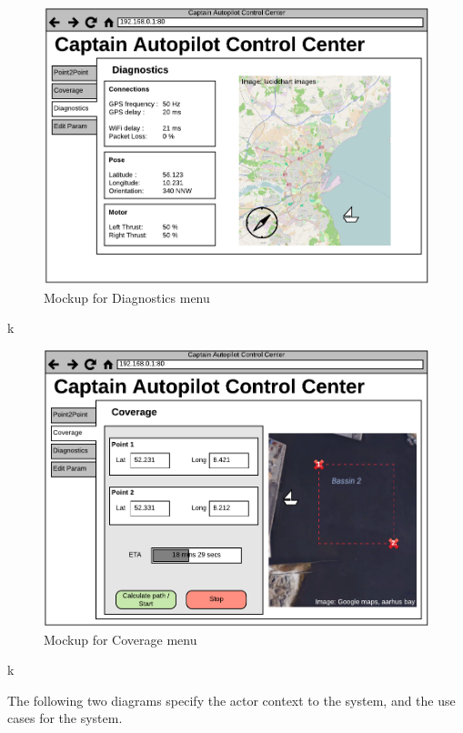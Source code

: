 \begin{figure}[H]
	\centering
	\includegraphics[width=1\linewidth]{Images/Design/UI_Mockup_Diagnostics.pdf}
	\caption{Mockup for Diagnostics menu}
\end{figure}

k

\begin{figure}[H]
	\centering
	\includegraphics[width=1\linewidth]{Images/Design/UI_Mockup_Coverage.pdf}
	\caption{Mockup for Coverage menu}
\end{figure}

k

The following two diagrams specify the actor context to the system, and the use cases for the system.

